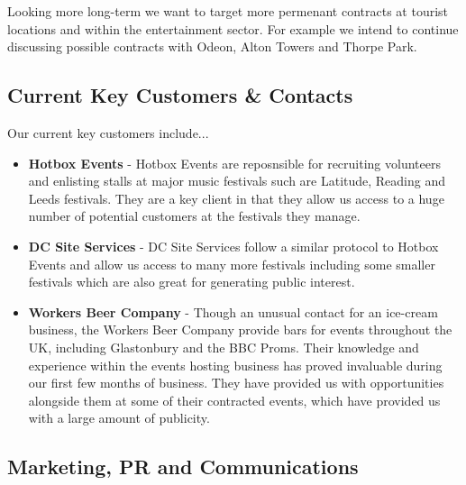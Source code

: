 \documentclass{article}
\begin{document}
  Looking more long-term we want to target more permenant contracts at tourist locations and within the entertainment sector. For example we intend to continue discussing possible contracts with Odeon, Alton Towers and Thorpe Park.

  \subsection{Current Key Customers \& Contacts}

  Our current key customers include...
  \begin{itemize}

  \item {\bf Hotbox Events} - Hotbox Events are reposnsible for recruiting volunteers and enlisting stalls at major music festivals such are Latitude, Reading and Leeds festivals. They are a key client in that they allow us access to a huge number of potential customers at the festivals they manage.

  \item {\bf DC Site Services} - DC Site Services follow a similar protocol to Hotbox Events and allow us access to many more festivals including some smaller festivals which are also great for generating public interest.

  \item {\bf Workers Beer Company} - Though an unusual contact for an ice-cream business, the Workers Beer Company provide bars for events throughout the UK, including Glastonbury and the BBC Proms. Their knowledge and experience within the events hosting business has proved invaluable during our first few months of business. They have provided us with opportunities alongside them at some of their contracted events, which have provided us with a large amount of publicity.

  \end{itemize}

  \subsection{Marketing, PR and Communications}
\end{document}
